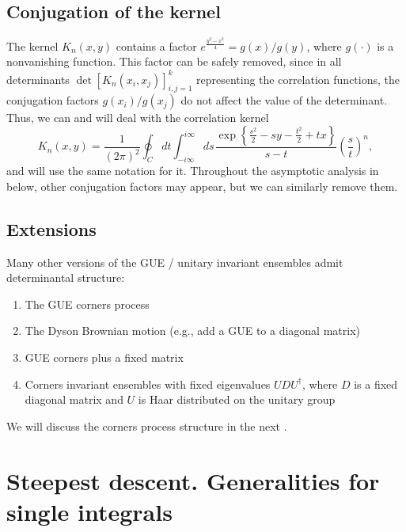 \documentclass[letterpaper,11pt,oneside,reqno]{book}
\numberwithin{equation}{chapter}  %
\newcommand{\ssp}{\hspace{1pt}}
\theoremstyle{definition}
\begin{document}
\subsection{Conjugation of the kernel}

The kernel $K_n(x,y)$ contains a factor $e^{\frac{y^2-x^2}{4}}=g(x)/g(y)$,
where $g(\cdot)$ is a nonvanishing function. This factor can be safely removed, since
in all determinants
$\det[K_n(x_i,x_j)]_{i,j=1}^k$
representing the correlation functions, the
conjugation factors $g(x_i)/g(x_j)$ do not affect the value of the determinant.
Thus, we can and will deal with the correlation kernel
\begin{equation}
	\label{lecture6:eq:K_n_conjugated}
	K_n(x,y)=\frac{1}{(2\pi)^2}
	\oint_C dt\int_{-i\infty}^{i\infty}ds\ssp
	\frac{\exp\left\{ \frac{s^2}{2}-sy-\frac{t^2}{2}+tx \right\}}{s-t}\left( \frac{s}{t} \right)^n
	,
\end{equation}
and will use the same notation for it.
Throughout the asymptotic analysis in  below,
other conjugation factors may appear, but we can similarly
remove them.

\subsection{Extensions}

Many other versions of the GUE / unitary invariant ensembles admit determinantal structure:
\begin{enumerate}
	\item The GUE corners process \cite{johansson2006eigenvalues}
    \item The Dyson Brownian motion (e.g., add a GUE to a diagonal matrix)
			\cite{nagao1998multilevel}
		\item GUE corners plus a fixed matrix \cite{Ferrari2014PerturbedGUE}
    \item Corners invariant ensembles with fixed eigenvalues $UDU^\dagger$, where $D$ is a fixed diagonal matrix and $U$ is Haar distributed
			on the unitary group \cite{Metcalfe2011GT}
	\end{enumerate}

We will discuss the corners process structure
in the next
.


\section{Steepest descent. Generalities for single integrals}
\end{document}
